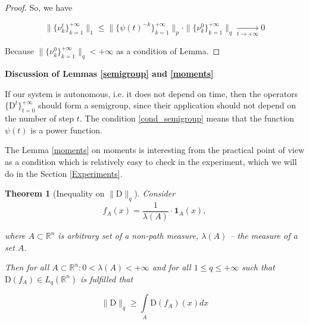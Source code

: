 \documentclass{article}
\newtheorem{theorem}{Theorem}
\begin{document}
\begin{proof}
        So, we have 

        \begin{equation*}
            \|\{\nu_k^t\}_{k=1}^{+\infty}\|_1 \leq \|\{\psi(t)^{-k}\}_{k=1}^{+\infty}\|_p \cdot \|\{\nu_k^0\}_{k=1}^{+\infty}\|_q \underset{t \to +\infty}{\longrightarrow} 0
        \end{equation*}

        Because $\|\{\nu_k^0\}_{k=1}^{+\infty}\|_q < +\infty$ as a condition of Lemma.
        
    \end{proof}


    \textbf{Discussion of Lemmas \ref{semigroup} and \ref{moments}}

    If our system is autonomous, i.e. it does not depend on time, then the operators $\{\text{D}^t\}_{t=0}^{+\infty}$ should form a semigroup, since their application should not depend on the number of step $t$. The condition \eqref{cond_semigroup} means that the function $\psi(t)$ is a power function.

    The Lemma \ref{moments} on moments is interesting from the practical point of view as a condition which is relatively easy to check in the experiment, which we will do in the Section \ref{Experiments}.
    
    \begin{theorem}[Inequality on $\|\text{D}\|_q$] \label{ineq_q}
        Consider 
        \begin{equation}\label{f_R}
            f_A(x) = \dfrac{1}{\lambda(A)} \cdot \textbf{1}_{A}(x),
        \end{equation}

        where $A \subset \mathbb{R}^n$ is arbitrary set of a non-path measure, $\lambda(A)$ -- the measure of a set $A$.

        Then for all $A \subset \mathbb{R}^n :  0 < \lambda(A) < +\infty$ and for all $1 \leq q \leq +\infty$ such that $\text{D}(f_A) \in L_q(\mathbb{R}^n)$ is fulfilled that  

        \begin{equation}\label{int_f_R}
            \|\text{D}\|_q \geq \int\limits_{A} \text{D}(f_A)(x)dx
        \end{equation}
    \end{theorem}
    
\end{document}
